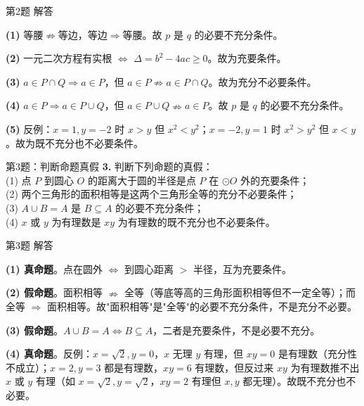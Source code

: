 \documentclass[10pt,aspectratio=169,serif]{beamer}
\begin{document}
\begin{frame}[t]{第2题 解答}
\begin{tcolorbox}[colback=orange!10,colframe=orange,title=\textbf{解}]
\textbf{(1)} 等腰$\nRightarrow$等边，等边$\Rightarrow$等腰。故 $p$ 是 $q$ 的\alert{必要不充分条件}。

\textbf{(2)} 一元二次方程有实根 $\Longleftrightarrow$ $\Delta=b^2-4ac\ge 0$。故为\alert{充要条件}。

\textbf{(3)} $a\in P\cap Q\Rightarrow a\in P$，但 $a\in P\nRightarrow a\in P\cap Q$。故为\alert{充分不必要条件}。

\textbf{(4)} $a\in P\Rightarrow a\in P\cup Q$，但 $a\in P\cup Q\nRightarrow a\in P$。故 $p$ 是 $q$ 的\alert{必要不充分条件}。

\textbf{(5)} 反例：$x=1,y=-2$ 时 $x>y$ 但 $x^2<y^2$；$x=-2,y=1$ 时 $x^2>y^2$ 但 $x<y$。故为\alert{既不充分也不必要条件}。
\end{tcolorbox}
\end{frame}

\begin{frame}[t]{第3题：判断命题真假}
\textbf{3.} 判断下列命题的真假：\\
(1) 点 $P$ 到圆心 $O$ 的距离大于圆的半径是点 $P$ 在 $\odot O$ 外的充要条件；\\
(2) 两个三角形的面积相等是这两个三角形全等的充分不必要条件；\\
(3) $A\cup B=A$ 是 $B\subseteq A$ 的必要不充分条件；\\
(4) $x$ 或 $y$ 为有理数是 $xy$ 为有理数的既不充分也不必要条件。
\end{frame}

\begin{frame}[t]{第3题 解答}
\begin{tcolorbox}[colback=orange!10,colframe=orange,title=\textbf{解}]
\textbf{(1) 真命题}。点在圆外 $\Longleftrightarrow$ 到圆心距离 $>$ 半径，互为充要条件。

\textbf{(2) 假命题}。面积相等 $\nRightarrow$ 全等（等底等高的三角形面积相等但不一定全等）；而全等 $\Rightarrow$ 面积相等。故"面积相等"是"全等"的\alert{必要不充分}条件，不是充分不必要。

\textbf{(3) 假命题}。$A\cup B=A \Longleftrightarrow B\subseteq A$，二者是\alert{充要}条件，不是必要不充分。

\textbf{(4) 真命题}。反例：$x=\sqrt{2}, y=0$，$x$ 无理 $y$ 有理，但 $xy=0$ 是有理数（充分性不成立）；$x=2,y=3$ 都是有理数，$xy=6$ 有理数，但反过来 $xy$ 为有理数推不出 $x$ 或 $y$ 有理（如 $x=\sqrt{2},y=\sqrt{2}$，$xy=2$ 有理但 $x,y$ 都无理）。故既不充分也不必要。
\end{tcolorbox}
\end{frame}
\end{document}
